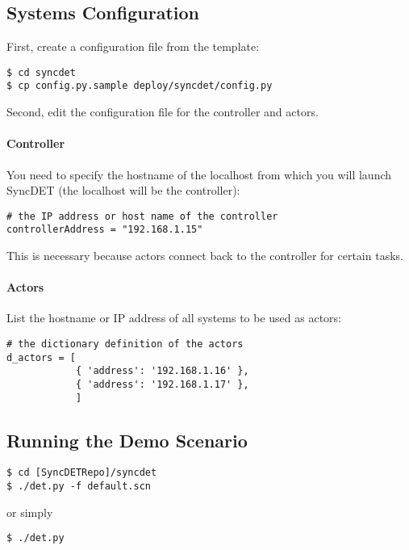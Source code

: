 \subsection{Systems Configuration}
First, create a configuration file from the template:
\begin{verbatim}
$ cd syncdet
$ cp config.py.sample deploy/syncdet/config.py
\end{verbatim}

Second, edit the configuration file for the controller and actors. 

\paragraph{Controller} 
You need to specify the hostname of the localhost from which you will launch
SyncDET (the localhost will be the controller):
\begin{verbatim}
# the IP address or host name of the controller
controllerAddress = "192.168.1.15"
\end{verbatim}
This is necessary because actors connect back to the controller for certain tasks.

\paragraph{Actors} 
List the hostname or IP address of all systems to be used as actors:
\begin{verbatim}
# the dictionary definition of the actors
d_actors = [
            { 'address': '192.168.1.16' },
            { 'address': '192.168.1.17' },
            ]
\end{verbatim}

\subsection{Running the Demo Scenario}
\begin{verbatim}
$ cd [SyncDETRepo]/syncdet
$ ./det.py -f default.scn
\end{verbatim}

or simply

\begin{verbatim}
$ ./det.py
\end{verbatim}
